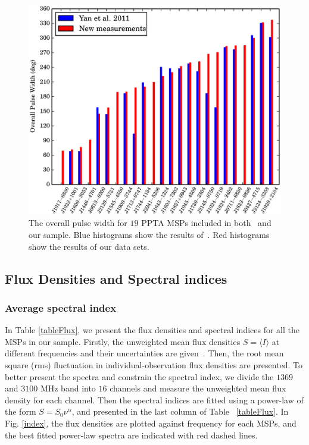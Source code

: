 \documentclass[useAMS,usenatbib]{mn2e}
\begin{document}
\newpage

\begin{figure}
\begin{center}
\includegraphics[width=3.5 in]{widthHist.ps}
\caption{The overall pulse width for $19$ PPTA MSPs included in both~\citet{Yan11} 
and our sample. Blue histograms show the results of~\citet{Yan11}. Red histograms 
show the results of our data sets. }
\label{widthHist}
\end{center}
\end{figure}


\subsection{Flux Densities and Spectral indices}

\subsubsection{Average spectral index}

In Table \ref{tableFlux}, we present the flux densities and spectral indices 
for all the MSPs in our sample.
%
Firstly, the unweighted mean flux densities $S=\langle I\rangle$ at different 
frequencies and their uncertainties are given~\citep[using methods described in][]{Toscano98}. 
%
Then, the root mean square (rms) fluctuation in individual-observation flux 
densities are presented. 
%
To better present the spectra and constrain the spectral index, we divide the 
$1369$ and $3100$ MHz band into $16$ channels and measure the unweighted mean 
flux density for each channel.
%
Then the spectral indices are fitted using a power-law of the form $S=S_{0}\nu^{\alpha}$, 
and presented in the last column of Table ~\ref{tableFlux}.
%
In Fig. \ref{index}, the flux densities are plotted against frequency for each 
MSPs, and the best fitted power-law spectra are indicated with red dashed lines.
%
\end{document}
